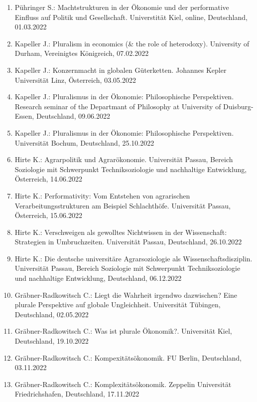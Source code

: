 \begin{enumerate}
	\item Pühringer S.: Machtstrukturen in der Ökonomie und der performative Einfluss auf Politik und Gesellschaft. Universtität Kiel, online, Deutschland, 01.03.2022
	\item Kapeller J.: Pluralism in economics (\& the role of heterodoxy). University of Durham, Vereinigtes Königreich, 07.02.2022
	\item Kapeller J.: Konzernmacht in globalen Güterketten. Johannes Kepler Universität Linz, Österreich, 03.05.2022
	\item Kapeller J.: Pluralismus in der Ökonomie: Philosophische Perspektiven. Research seminar of the Departmant of Philosophy at University of Duisburg-Essen, Deutschland, 09.06.2022
	\item Kapeller J.: Pluralismus in der Ökonomie: Philosophische Perspektiven. Universität Bochum, Deutschland, 25.10.2022
	\item Hirte K.: Agrarpolitik und Agrarökonomie. Universität Passau, Bereich Soziologie mit Schwerpunkt Techniksoziologie und nachhaltige Entwicklung, Österreich, 14.06.2022
	\item Hirte K.: Performativity: Vom Entstehen von agrarischen Verarbeitungsstrukturen am Beispiel Schlachthöfe. Universität Passau, Österreich, 15.06.2022
	\item Hirte K.: Verschweigen als gewolltes Nichtwissen in der Wissenschaft: Strategien in Umbruchzeiten. Universität Passau, Deutschland, 26.10.2022
	\item Hirte K.: Die deutsche universitäre Agrarsoziologie als Wissenschaftsdisziplin. Universität Passau, Bereich Soziologie mit Schwerpunkt Techniksoziologie und nachhaltige Entwicklung, Deutschland, 06.12.2022
	\item Gräbner-Radkowitsch C.: Liegt die Wahrheit irgendwo dazwischen? Eine plurale Perspektive auf globale Ungleichheit. Universität Tübingen, Deutschland, 02.05.2022
	\item Gräbner-Radkowitsch C.: Was ist plurale Ökonomik?. Universität Kiel, Deutschland, 19.10.2022
	\item Gräbner-Radkowitsch C.: Kompexitätsökonomik. FU Berlin, Deutschland, 03.11.2022
	\item Gräbner-Radkowitsch C.: Komplexitätsökonomik. Zeppelin Universität Friedrichshafen, Deutschland, 17.11.2022
\end{enumerate}

